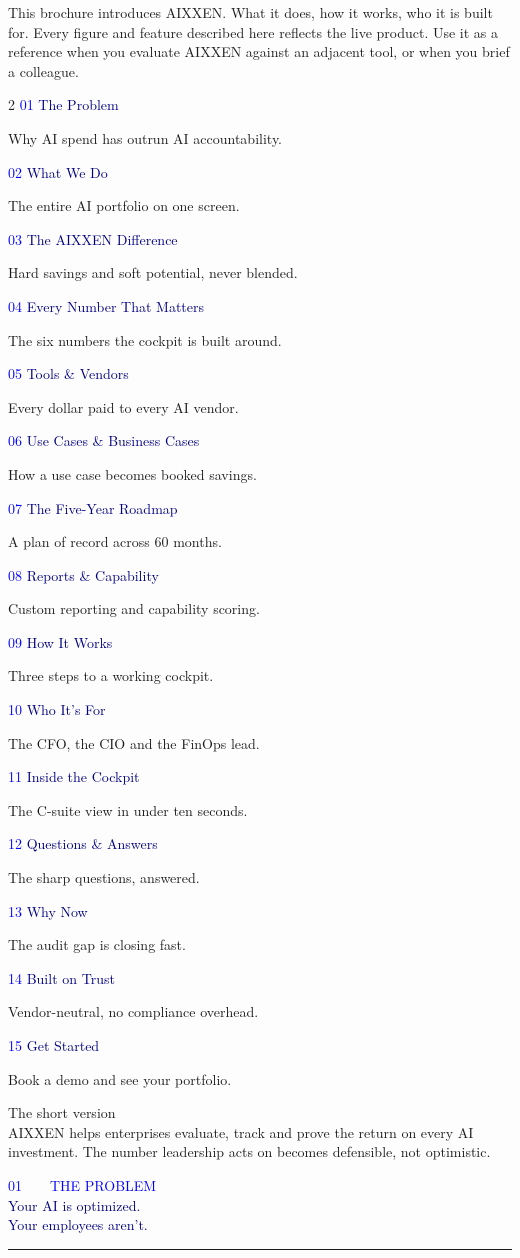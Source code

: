 \documentclass[10pt]{article}
\newcommand{\bodysize}{\fontsize{9.6}{15.2}\selectfont}
\newcommand{\sectionhead}[3]{%
  {\semibold\fontsize{8}{8}\selectfont\textcolor{blue}{#1\ \ \textbullet\ \ \MakeUppercase{#2}}}\\[5pt]
  {\black\fontsize{25}{28}\selectfont\textcolor{navy}{#3}}\\[6pt]
  {\color{blue}\rule{40pt}{2.8pt}}\par\vspace{14pt}}
\newcommand{\bodyslate}[1]{{\bodysize\textcolor{slate}{#1}\par}}
\begin{document}
\bodyslate{This brochure introduces AIXXEN. What it does, how it works, who it is built for. Every figure and feature described here reflects the live product. Use it as a reference when you evaluate AIXXEN against an adjacent tool, or when you brief a colleague.}
\vspace{16pt}

{\setlength{\columnsep}{34pt}
\begin{multicols}{2}
\newcommand{\toc}[3]{%
  {\semibold\fontsize{8.5}{8.5}\selectfont\textcolor{blue}{#1}}\hspace{8pt}%
  {\heavy\fontsize{10.3}{13}\selectfont\textcolor{navy}{#2}}\\[1pt]
  {\raggedright\fontsize{8.2}{11}\selectfont\textcolor{slate}{#3}\par}
  \vspace{4pt}{\color{linegray}\rule{\linewidth}{0.6pt}}\par\vspace{8pt}}
\toc{01}{The Problem}{Why AI spend has outrun AI accountability.}
\toc{02}{What We Do}{The entire AI portfolio on one screen.}
\toc{03}{The AIXXEN Difference}{Hard savings and soft potential, never blended.}
\toc{04}{Every Number That Matters}{The six numbers the cockpit is built around.}
\toc{05}{Tools \& Vendors}{Every dollar paid to every AI vendor.}
\toc{06}{Use Cases \& Business Cases}{How a use case becomes booked savings.}
\toc{07}{The Five-Year Roadmap}{A plan of record across 60 months.}
\toc{08}{Reports \& Capability}{Custom reporting and capability scoring.}
\toc{09}{How It Works}{Three steps to a working cockpit.}
\toc{10}{Who It's For}{The CFO, the CIO and the FinOps lead.}
\toc{11}{Inside the Cockpit}{The C-suite view in under ten seconds.}
\toc{12}{Questions \& Answers}{The sharp questions, answered.}
\toc{13}{Why Now}{The audit gap is closing fast.}
\toc{14}{Built on Trust}{Vendor-neutral, no compliance overhead.}
\toc{15}{Get Started}{Book a demo and see your portfolio.}
\end{multicols}}

\vfill
\begin{navyblock}
{\heavy\fontsize{11}{14}\selectfont The short version}\\[3pt]
{\bodysize AIXXEN helps enterprises evaluate, track and prove the return on every AI investment. The number leadership acts on becomes defensible, not optimistic.}
\end{navyblock}
\newpage

\sectionhead{01}{The Problem}{Your AI is optimized.\\Your employees aren't.}
\end{document}
